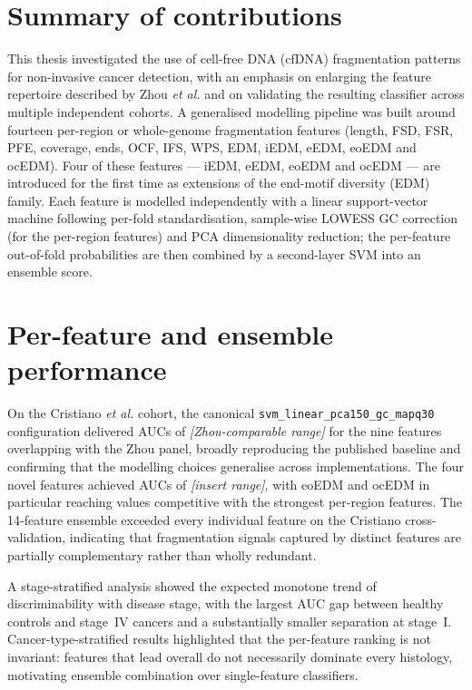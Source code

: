 
\section{Summary of contributions}

This thesis investigated the use of cell-free DNA (cfDNA) fragmentation patterns
for non-invasive cancer detection, with an emphasis on enlarging the feature
repertoire described by Zhou \emph{et al.} and on validating the resulting
classifier across multiple independent cohorts. A generalised
modelling pipeline was built around fourteen per-region or whole-genome
fragmentation features (length, FSD, FSR, PFE, coverage, ends, OCF, IFS, WPS,
EDM, iEDM, eEDM, eoEDM and ocEDM). Four of these features --- iEDM, eEDM,
eoEDM and ocEDM --- are introduced for the first time as extensions of the
end-motif diversity (EDM) family. Each feature is modelled independently
with a linear support-vector machine following per-fold standardisation,
sample-wise LOWESS GC correction (for the per-region features) and PCA dimensionality
reduction; the per-feature out-of-fold probabilities are then combined by a
second-layer SVM into an ensemble score.

\section{Per-feature and ensemble performance}

On the Cristiano \emph{et al.} cohort, the canonical
\texttt{svm\_linear\_pca150\_gc\_mapq30} configuration delivered AUCs of
\emph{[Zhou-comparable range]} for the nine features overlapping with the
Zhou panel, broadly reproducing the published baseline and confirming that
the modelling choices generalise across implementations. The four novel
features achieved AUCs of \emph{[insert range]}, with eoEDM and ocEDM in
particular reaching values competitive with the strongest per-region
features. The 14-feature ensemble exceeded every individual feature on the
Cristiano cross-validation, indicating that fragmentation signals captured by
distinct features are partially complementary rather than wholly redundant.

A stage-stratified analysis showed the expected monotone trend of
discriminability with disease stage, with the largest AUC gap between
healthy controls and stage~IV cancers and a substantially smaller separation
at stage~I. Cancer-type-stratified results highlighted that the per-feature
ranking is not invariant: features that lead overall do not necessarily
dominate every histology, motivating ensemble combination over single-feature
classifiers.

